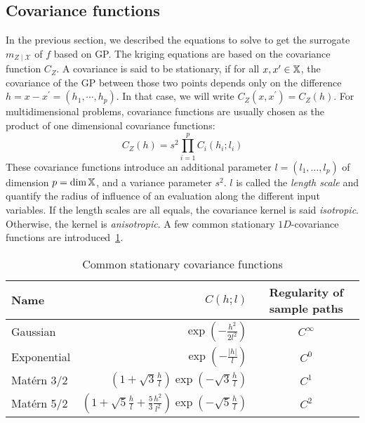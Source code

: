\documentclass[../../Main_ManuscritThese.tex]{subfiles}
\begin{document}
\subsection{Covariance functions}
\label{sec:cov_fun}
In the previous section, we described the equations to solve to get
the surrogate $m_{Z\mid \mathcal{X}}$ of $f$ based on GP.  The kriging
equations are based on the covariance function $C_Z$.  A covariance is
said to be stationary, if for all $x, x^{\prime} \in \mathbb{X}$, the
covariance of the GP between those two points depends only on the
difference $h = x-x^{\prime}=(h_1,\cdots, h_{p})$. In that case, we
will write $C_Z(x, x^{\prime}) = C_Z(h)$.  For multidimensional
problems, covariance functions are usually chosen as the product of
one dimensional covariance functions:
\begin{equation}
  C_Z(h) = s^2\prod_{i=1}^{p} C_i(h_i;l_i)
\end{equation}
These covariance functions introduce an additional parameter
$l=(l_1,\dots,l_p)$ of dimension $p=\dim \mathbb{X}$, and a variance
parameter $s^2$.  $l$ is called the \emph{length scale} and quantify
the radius of influence of an evaluation along the different input
variables. If the length scales are all equals, the covariance kernel
is said \emph{isotropic}. Otherwise, the kernel is \emph{anisotropic}.
A few common stationary $1D$-covariance functions are
introduced~\cref{tab:common_cov_fc}.

  \begin{table}[ht]
    \centering 
    \begin{tabular}{lrc}
      \toprule
      Name        & $C(h;l)$                                                                                                 & Regularity of sample paths \\ \midrule
      Gaussian    & $\exp\left(- \frac{h^2}{2 l^2}\right)$                                                                   & $C^{\infty}$               \\
      Exponential & $\exp\left(- \frac{\lvert h \rvert}{l}\right)$                                                           & $C^0$                      \\
      Matérn 3/2  & $\left(1 + \sqrt{3}\frac{h}{l}\right)\exp\left(-\sqrt{3}\frac{h}{l}\right)$                              & $C^1$                      \\
      Matérn 5/2  & $\left(1+ \sqrt{5}\frac{h}{l} + \frac{5}{3}\frac{h^2}{l^2}\right) \exp\left(-\sqrt{5}\frac{h}{l}\right)$ & $C^2$                      \\ \bottomrule
    \end{tabular}
    \caption{\label{tab:common_cov_fc} Common stationary covariance functions}
  \end{table}
\end{document}
